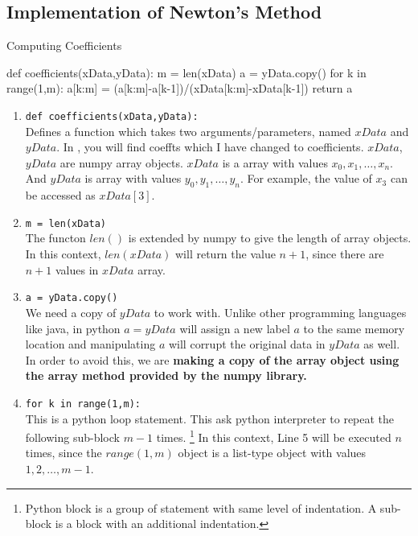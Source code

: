 \subsection{Implementation of Newton's Method}

\begin{program}Computing Coefficients
	\begin{python}
		def coefficients(xData,yData):
			m = len(xData)
			a = yData.copy()
			for k in range(1,m):
				a[k:m] = (a[k:m]-a[k-1])/(xData[k:m]-xData[k-1])
			return a
	\end{python}
\end{program}
\begin{commentary}
\begin{enumerate}[label=Line \arabic*]
	\item \texttt{def coefficients(xData,yData):} \\
		Defines a function which takes two arguments/parameters, named $xData$ and $yData$.
		In \cite[3.2]{kiusalaas}, you will find coeffts which I have changed to coefficients.
		$xData$,$yData$ are numpy array objects.
		$xData$ is a array with values $x_0,x_1,\dots,x_n$.
		And $yData$ is array with values $y_0,y_1,\dots,y_n$.
		For example, the value of $x_3$ can be accessed as $xData[3]$.
	\item \texttt{m = len(xData)}\\
		The functon $len()$ is extended by numpy to give the length of array objects.
		In this context, $len(xData)$ will return the value $n+1$, since there are $n+1$ values in $xData$ array.
	\item \texttt{a = yData.copy()}\\
		We need a copy of $yData$ to work with.
		Unlike other programming languages like java, in python $a = yData$ will assign a new label $a$ to the same memory location and manipulating $a$ will corrupt the original data in $yData$ as well.
		In order to avoid this, we are \textbf{making a copy of the array object using the array method provided by the numpy library.}
	\item \texttt{for k in range(1,m):}\\
		This is a python loop statement.
		This ask python interpreter to repeat the following sub-block $m-1$ times.
		\footnote{
			Python block is a group of statement with same level of indentation.
			A sub-block is a block with an additional indentation.
		}
		In this context, Line 5 will be executed $n$ times, since the $range(1,m)$ object is a list-type object with values $1,2,\dots,m-1$.

\end{enumerate}
\end{commentary}
